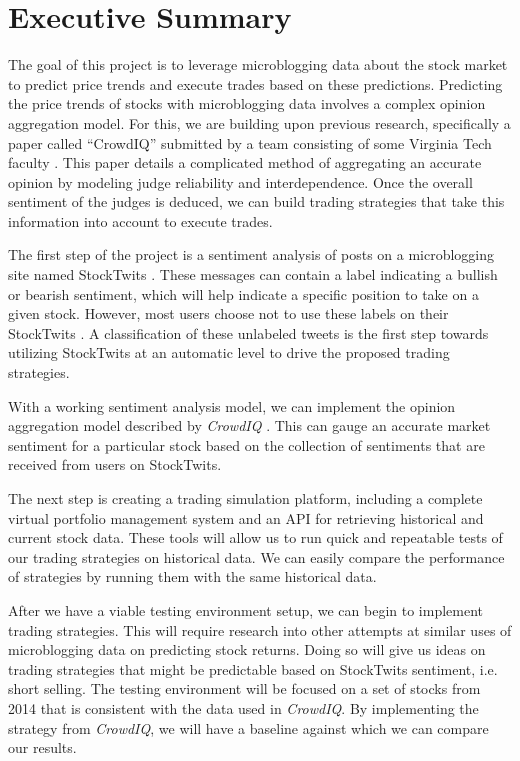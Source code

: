 
\section{Executive Summary}

The goal of this project is to leverage microblogging data about the stock market to predict price trends and execute trades based on these predictions. Predicting the price trends of stocks with microblogging data involves a complex opinion aggregation model. For this, we are building upon previous research, specifically a paper called ``CrowdIQ'' submitted by a team consisting of some Virginia Tech faculty \cite{crowdiq}. This paper details a complicated method of aggregating an accurate opinion by modeling judge reliability and interdependence. Once the overall sentiment of the judges is deduced, we can build trading strategies that take this information into account to execute trades.

The first step of the project is a sentiment analysis of posts on a microblogging site named StockTwits \cite{stocktwits}. These messages can contain a label indicating a bullish or bearish sentiment, which will help indicate a specific position to take on a given stock. However, most users choose not to use these labels on their StockTwits \cite{crowdiq}. A classification of these unlabeled tweets is the first step towards utilizing StockTwits at an automatic level to drive the proposed trading strategies.

With a working sentiment analysis model, we can implement the opinion aggregation model described by \textit{CrowdIQ} \cite{crowdiq}. This can gauge an accurate market sentiment for a particular stock based on the collection of sentiments that are received from users on StockTwits.

The next step is creating a trading simulation platform, including a complete virtual portfolio management system and an API for retrieving historical and current stock data. These tools will allow us to run quick and repeatable tests of our trading strategies on historical data. We can easily compare the performance of strategies by running them with the same historical data.

After we have a viable testing environment setup, we can begin to implement trading strategies. This will require research into other attempts at similar uses of microblogging data on predicting stock returns. Doing so will give us ideas on trading strategies that might be predictable based on StockTwits sentiment, i.e. short selling. The testing environment will be focused on a set of stocks from 2014 that is consistent with the data used in \textit{CrowdIQ}. By implementing the strategy from \textit{CrowdIQ}, we will have a baseline against which we can compare our results.


